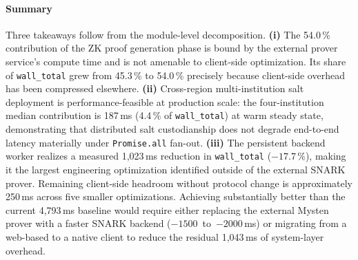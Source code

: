 \paragraph{Summary}

Three takeaways follow from the module-level decomposition.
\textbf{(i)} The 54.0\,\% contribution of the ZK proof generation phase
is bound by the external prover service's compute time and is not
amenable to client-side optimization. Its share of
\texttt{wall\_total} grew from 45.3\,\% to 54.0\,\% precisely because
client-side overhead has been compressed elsewhere.
\textbf{(ii)} Cross-region multi-institution salt deployment is
performance-feasible at production scale: the four-institution median
contribution is 187\,ms (4.4\,\% of \texttt{wall\_total}) at warm
steady state, demonstrating that distributed salt custodianship does
not degrade end-to-end latency materially under \texttt{Promise.all}
fan-out.
\textbf{(iii)} The persistent backend worker realizes a measured
1{,}023\,ms reduction in \texttt{wall\_total} (\(-17.7\,\%\)), making
it the largest engineering optimization identified outside of the
external SNARK prover. Remaining client-side headroom without protocol
change is approximately 250\,ms across five smaller optimizations.
Achieving substantially better than the current 4{,}793\,ms baseline
would require either replacing the external Mysten prover with a
faster SNARK backend (\(-1500\)~to~\(-2000\)\,ms) or migrating from a
web-based to a native client to reduce the residual 1{,}043\,ms of
system-layer overhead.
